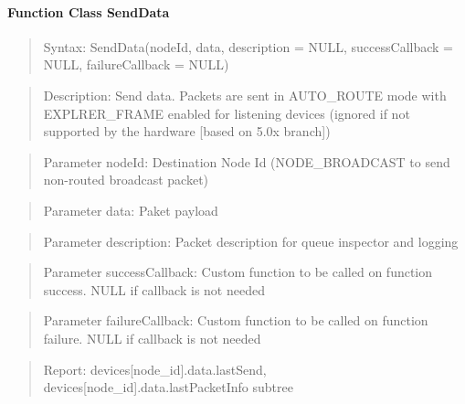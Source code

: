 \paragraph{Function Class SendData}
\begin{quote}Syntax: SendData(nodeId, data, description = NULL, successCallback = NULL, failureCallback = NULL)\end{quote}
\begin{quote}Description: Send data. Packets are sent in AUTO\_ROUTE mode with EXPLRER\_FRAME enabled for listening devices (ignored if not supported by the hardware [based on 5.0x branch])\end{quote}
\begin{quote}Parameter nodeId: Destination Node Id (NODE\_BROADCAST to send non-routed broadcast packet)\end{quote}
\begin{quote}Parameter data: Paket payload\end{quote}
\begin{quote}Parameter description: Packet description for queue inspector and logging\end{quote}
\begin{quote}Parameter successCallback: Custom function to be called on function success. NULL if callback is not needed\end{quote}
\begin{quote}Parameter failureCallback: Custom function to be called on function failure. NULL if callback is not needed\end{quote}
\begin{quote}Report: devices[node\_id].data.lastSend, devices[node\_id].data.lastPacketInfo subtree\end{quote}

